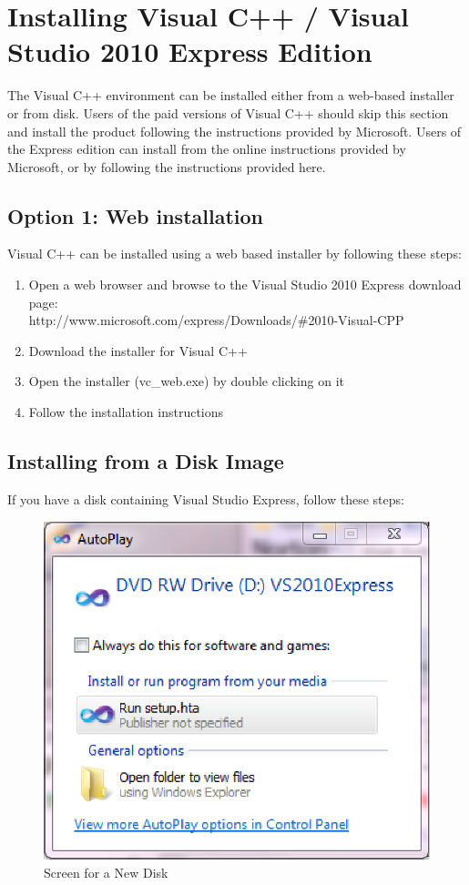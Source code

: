 \documentclass[letterpaper,10pt]{article}%
\begin{document}
\section{Installing Visual C++ / Visual Studio 2010 Express Edition}

The Visual C++ environment can be installed either from a web-based installer or from disk.  Users of the paid versions of Visual C++ should skip this section and install the product following the instructions provided by Microsoft.  Users of the Express edition can install from the online instructions provided by Microsoft, or by following the instructions provided here.

\subsection{Option 1: Web installation}

Visual C++ can be installed using a web based installer by following these steps:

\begin{enumerate}
	\item Open a web browser and browse to the Visual Studio 2010 Express download page: \\http://www.microsoft.com/express/Downloads/\#2010-Visual-CPP
	\item Download the installer for Visual C++
	\item Open the installer (vc\_web.exe) by double clicking on it
	\item Follow the installation instructions
\end{enumerate}

\subsection{Installing from a Disk Image}

If you have a disk containing Visual Studio Express, follow these steps:

\begin{figure}
\centering
\includegraphics{DiskStart.eps}
\caption{Screen for a New Disk}
\label{fig:DiskStart}
\end{figure}
\end{document}
